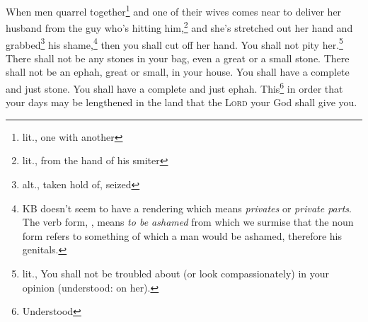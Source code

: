 \begin{inparaenum}
     When men quarrel together\footnote{lit., one with another} and one of their wives comes near to deliver her husband from the guy who's hitting him,\footnote{lit., from the hand of his smiter} and she's stretched out her hand and grabbed\footnote{alt., taken hold of, seized} his shame,\footnote{KB doesn't seem to have a rendering which means \textit{privates} or \textit{private parts}. The verb form, , means \textit{to be ashamed} from which we surmise that the noun form refers to something of which a man would be ashamed, therefore his genitals.}%
     then you shall cut off her hand. You shall not pity her.\footnote{lit., You shall not be troubled about (or look compassionately) in your opinion (understood: on her).}%
     There shall not be any stones in your bag, even a great or a small stone.%
     There shall not be an ephah, great or small, in your house.%
     You shall have a complete and just stone. You shall have a complete and just ephah. This\footnote{Understood} in order that your days may be lengthened in the land that the \textsc{Lord} your God shall give you.%
\end{inparaenum}
